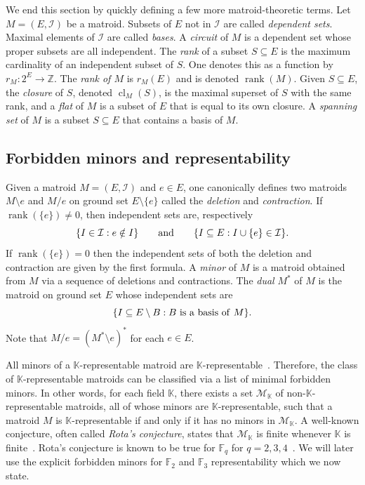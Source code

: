 \documentclass[12pt]{article}
\theoremstyle{definition}
\DeclareMathOperator{\rank}{rank}
\DeclareMathOperator{\cl}{cl}
\begin{document}
We end this section by quickly defining a few more matroid-theoretic terms.
Let $M = (E,\mathcal{I})$ be a matroid.
Subsets of $E$ not in $\mathcal{I}$ are called \emph{dependent sets}.
Maximal elements of $\mathcal{I}$ are called \emph{bases}.
A \emph{circuit} of $M$ is a dependent set whose proper subsets are all independent.
The \emph{rank} of a subset $S \subseteq E$ is the maximum cardinality of an independent subset of $S$.
One denotes this as a function by $r_M : 2^E \rightarrow \mathbb{Z}$.
The \emph{rank of $M$} is $r_M(E)$ and is denoted $\rank(M)$.
Given $S \subseteq E$, the \emph{closure} of $S$, denoted $\cl_M(S)$, is the maximal superset of $S$ with the same rank,
and a \emph{flat} of $M$ is a subset of $E$ that is equal to its own closure. A \emph{spanning set} of $M$ is a subset $S\subseteq E$  that contains a basis of $M$.

\subsection{Forbidden minors and representability}

Given a matroid $M = (E,\mathcal{I})$ and $e \in E$,
one canonically defines two matroids $M \setminus e$ and $M / e$ on ground set $E \setminus \{e\}$
called the \emph{deletion} and \emph{contraction}.
If $\rank(\{e\}) \neq 0$, then independent sets are, respectively
\[
    \{I \in \mathcal{I} : e \notin I\} \qquad {\rm and} \qquad \{I \subseteq E: I \cup \{e\} \in \mathcal{I} \}.
\]
If $\rank(\{e\}) = 0$ then the independent sets of both the deletion and contraction are given by the first formula.
A \emph{minor} of $M$ is a matroid obtained from $M$ via a sequence of deletions and contractions.
The \emph{dual} $M^*$ of $M$ is the matroid on ground set $E$ whose independent sets are
\[
    \{I \subseteq E\setminus B : B {\rm \ is \ a \ basis \ of \ } M\}.
\]
Note that $M / e = (M^* \setminus e)^*$ for each $e \in E$.

All minors of a $\mathbb{K}$-representable matroid are $\mathbb{K}$-representable~\cite[Proposition 3.2.4]{oxley}.
Therefore, the class of $\mathbb{K}$-representable matroids can be classified via a list of minimal forbidden minors.
In other words, for each field $\mathbb{K}$, there exists a set $\mathcal{M}_\mathbb{K}$ of non-$\mathbb{K}$-representable matroids,
all of whose minors are $\mathbb{K}$-representable, such that a matroid $M$ is $\mathbb{K}$-representable if and only if it has no minors in $\mathcal{M}_\mathbb{K}$.
A well-known conjecture, often called \emph{Rota's conjecture},
states that $\mathcal{M}_{\mathbb{K}}$
is finite whenever $\mathbb{K}$ is finite~\cite{geelen2014solving}.
Rota's conjecture is known to be true for $\mathbb{F}_q$ for $q = 2,3,4$~\cite[Chapter~6.5]{oxley}.
We will later use the explicit forbidden minors for $\mathbb{F}_2$ and $\mathbb{F}_3$ representability
which we now state.
\end{document}
